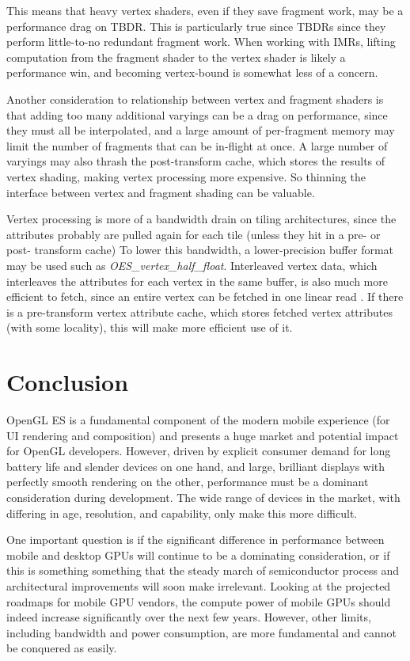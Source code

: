 This means that heavy vertex shaders, even if they save fragment work, may be a
performance drag on TBDR.  This is particularly true since TBDRs since they
perform little-to-no redundant fragment work.  When working with IMRs, lifting
computation from the fragment shader to the vertex shader is likely a
performance win, and becoming vertex-bound is somewhat less of a concern.

Another consideration to relationship between vertex and fragment shaders is
that adding too many additional varyings can be a drag on performance, since
they must all be interpolated, and a large amount of per-fragment memory may
limit the number of fragments that can be in-flight at once.  A large number of
varyings may also thrash the post-transform cache, which stores the results of
vertex shading, making vertex processing more expensive.  So thinning the
interface between vertex and fragment shading can be valuable.

Vertex processing is more of a bandwidth drain on tiling architectures, since
the attributes probably are pulled again for each tile (unless they hit in a
pre- or post- transform cache)  To lower this bandwidth, a lower-precision
buffer format may be used such as \textit{OES\_vertex\_half\_float}.
Interleaved vertex data, which interleaves the attributes for each vertex in
the same buffer, is also much more efficient to fetch, since an entire vertex
can be fetched in one linear read \cite{Apple11}.  If there is a pre-transform
vertex attribute cache, which stores fetched vertex attributes (with some
locality), this will make more efficient use of it.

\section{Conclusion}\label{Jon-McCaffrey-Conclusion}

OpenGL ES is a fundamental component of the modern mobile experience (for UI
rendering and composition) \cite{Guy11} and presents a huge market and
potential impact for OpenGL developers.  However, driven by explicit consumer
demand for long battery life and slender devices on one hand, and large,
brilliant displays with perfectly smooth rendering on the other, performance
must be a dominant consideration during development.  The wide range of devices
in the market, with differing in age, resolution, and capability, only make
this more difficult.

One important question is if the significant difference in performance between
mobile and desktop GPUs will continue to be a dominating consideration, or if
this is something something that the steady march of semiconductor process and
architectural improvements will soon make irrelevant.  Looking at the projected
roadmaps for mobile GPU vendors, the compute power of mobile GPUs should indeed
increase significantly over the next few years.  However, other limits,
including bandwidth and power consumption, are more fundamental and cannot be
conquered as easily.

